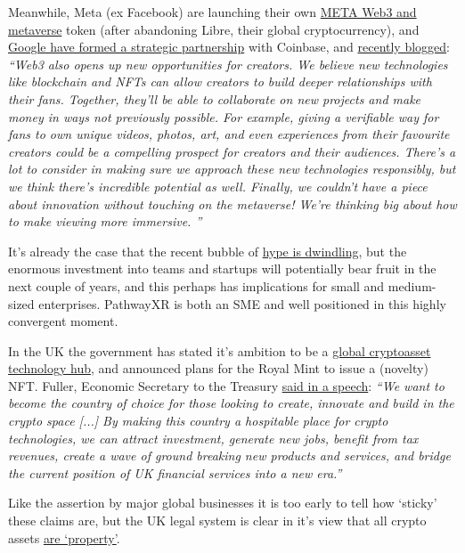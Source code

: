 Meanwhile, Meta (ex Facebook) are launching their own \href{https://archive.ph/coyp2}{META Web3 and metaverse} token (after abandoning Libre, their global cryptocurrency), and \href{https://www.coinbase.com/blog/announcing-coinbase-google-cloud}{Google have formed a strategic partnership} with Coinbase, and \href{https://blog.youtube/inside-youtube/innovations-for-2022-at-youtube/}{recently blogged}: \textit{``Web3 also opens up new opportunities for creators. We believe new technologies like blockchain and NFTs can allow creators to build deeper relationships with their fans. Together, they'll be able to collaborate on new projects and make money in ways not previously possible. For example, giving a verifiable way for fans to own unique videos, photos, art, and even experiences from their favourite creators could be a compelling prospect for creators and their audiences. There's a lot to consider in making sure we approach these new technologies responsibly, but we think there's incredible potential as well. Finally, we couldn't have a piece about innovation without touching on the metaverse! We're thinking big about how to make viewing more immersive. ''}\par
It's already the case that the recent bubble of \href{https://www.forbes.com/sites/paultassi/2022/03/10/interest-in-nfts-and-the-metaverse-is-falling-fast/?}{hype is dwindling}, but the enormous investment into teams and startups will potentially bear fruit in the next couple of years, and this perhaps has implications for small and medium-sized enterprises. PathwayXR is both an SME and well positioned in this highly convergent moment.\par
In the UK the government has stated it's ambition to be a \href{https://www.gov.uk/government/news/government-sets-out-plan-to-make-uk-a-global-cryptoasset-technology-hub}{global cryptoasset technology hub}, and announced plans for the Royal Mint to issue a (novelty) NFT. Fuller, Economic Secretary to the Treasury \href{https://drive.google.com/file/d/19ZYKLeT-ds3TueTpqSM22MUqB4gmN_Pl/view}{said in a speech}: \textit{``We want to become the country of choice for those looking to create, innovate and build in the crypto space [...] By making this country a hospitable place for crypto technologies, we can attract investment, generate new jobs, benefit from tax revenues, create a wave of ground breaking new products and services, and bridge the current position of UK financial services into a new era.''}\par
Like the assertion by major global businesses it is too early to tell how `sticky' these claims are, but the UK legal system is clear in it's view that all crypto assets \href{https://blockchain.bakermckenzie.com/2020/02/03/uk-court-confirms-bitcoins-status-as-property/}{are `property'}.\par

